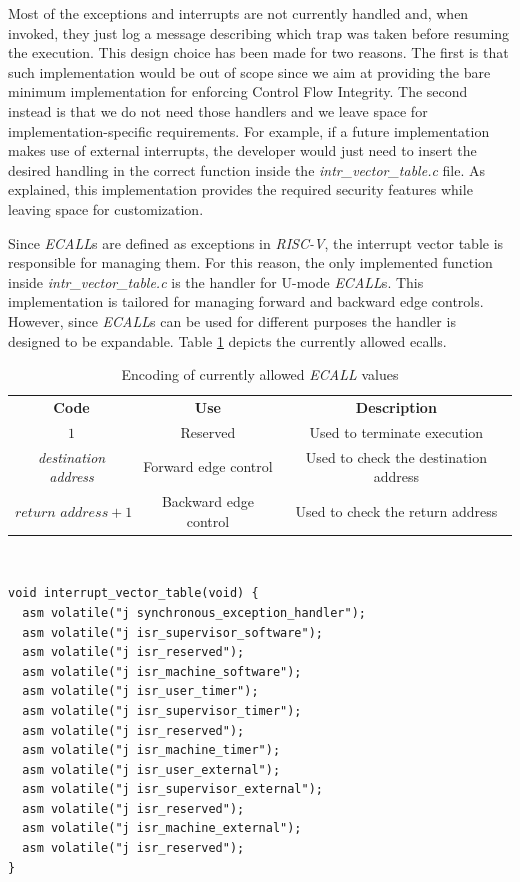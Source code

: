 Most of the exceptions and interrupts are not currently handled and, when
invoked, they just log a message describing which trap was taken before resuming
the execution. This design choice has been made for two reasons. The first is that
such implementation would be out of scope since we aim at providing the bare minimum
implementation for enforcing Control Flow Integrity. The second instead is that
we do not need those handlers and we leave space for implementation-specific
requirements. For example, if a future implementation makes use of external
interrupts, the developer would just need to insert the desired handling in the correct
function inside the \textit{intr\_vector\_table.c} file. As explained, this
implementation provides the required security features while leaving space for
customization.

Since \textit{ECALL}s are defined as exceptions in \textit{RISC-V}, the
interrupt vector table is responsible for managing them. For this reason, the
only implemented function inside \textit{intr\_vector\_table.c} is the handler for
U-mode \textit{ECALL}s. This implementation is tailored for managing forward and
backward edge controls. However, since \textit{ECALL}s can be used for different
purposes the handler is designed to be expandable. Table \ref{tab:ecalls} depicts
the currently allowed ecalls.
\begin{table}
  \centering
  \begin{tabular}{|c|c|c|}
    \hline
    \textbf{Code}                & \textbf{Use}          & \textbf{Description}                  \\
    \hhline{===} $1$             & Reserved              & Used to terminate execution           \\
    \hline
    \textit{destination address} & Forward edge control  & Used to check the destination address \\
    \hline
    $\textit{return address}+ 1$ & Backward edge control & Used to check the return address      \\
    \hline
  \end{tabular}
  \caption{Encoding of currently allowed \textit{ECALL} values}
  \label{tab:ecalls}
\end{table}
\\
\begin{lstlisting}[style=CStyle, caption = Interrput Vector Table, label={lst:intrtable}]
void interrupt_vector_table(void) {
  asm volatile("j synchronous_exception_handler");
  asm volatile("j isr_supervisor_software");
  asm volatile("j isr_reserved");
  asm volatile("j isr_machine_software");
  asm volatile("j isr_user_timer");
  asm volatile("j isr_supervisor_timer");
  asm volatile("j isr_reserved");
  asm volatile("j isr_machine_timer");
  asm volatile("j isr_user_external");
  asm volatile("j isr_supervisor_external");
  asm volatile("j isr_reserved");
  asm volatile("j isr_machine_external");
  asm volatile("j isr_reserved");
}
\end{lstlisting}

